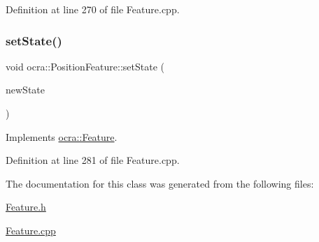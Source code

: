 Definition at line 270 of file Feature.\+cpp.

\hypertarget{classocra_1_1PositionFeature_a59ca48f39003aeba08dd8a6e8eec686c}{}\label{classocra_1_1PositionFeature_a59ca48f39003aeba08dd8a6e8eec686c} 
\subsubsection{\texorpdfstring{set\+State()}{setState()}}
{\footnotesize\ttfamily void ocra\+::\+Position\+Feature\+::set\+State (\begin{DoxyParamCaption}\item[{const \hyperlink{classocra_1_1TaskState}{Task\+State} \&}]{new\+State }\end{DoxyParamCaption})\hspace{0.3cm}{\ttfamily [virtual]}}



Implements \hyperlink{classocra_1_1Feature_ad16d6b176b229280649ab405531e9a30}{ocra\+::\+Feature}.



Definition at line 281 of file Feature.\+cpp.



The documentation for this class was generated from the following files\+:\begin{DoxyCompactItemize}
\item 
\hyperlink{Feature_8h}{Feature.\+h}\item 
\hyperlink{Feature_8cpp}{Feature.\+cpp}\end{DoxyCompactItemize}
